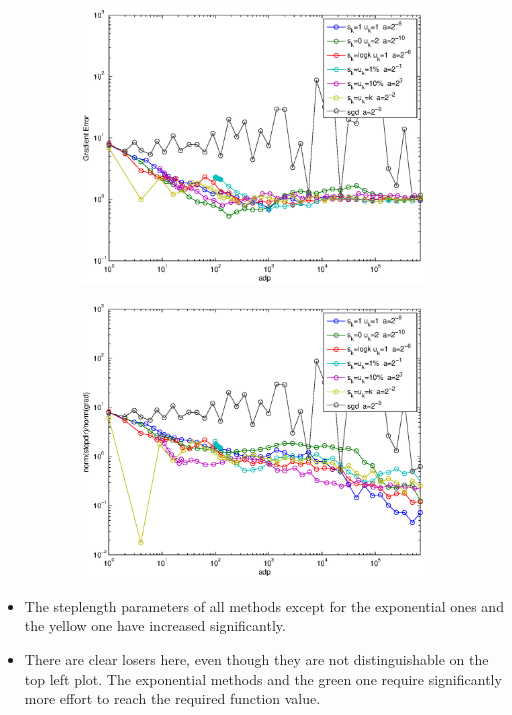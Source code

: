 \documentclass[12pt]{article}
\begin{document}
\begin{figure}[H]
	\begin{subfigure}[b]{.5\linewidth}
		        \includegraphics[width=4in]{Figures/whowins2-3.eps}
	\end{subfigure}%
	\begin{subfigure}[b]{.5\linewidth}
		        \includegraphics[width=4in]{Figures/whowins2-4.eps}
	\end{subfigure}%
	\end{figure}
	
	\begin{itemize}
		\item The steplength parameters of all methods except for the exponential ones and the yellow one have increased significantly. 
		\item There are clear losers here, even though they are not distinguishable on the top left plot. The exponential methods and the green one require significantly more effort to reach the required function value. 
	\end{itemize}
	
\end{document}
